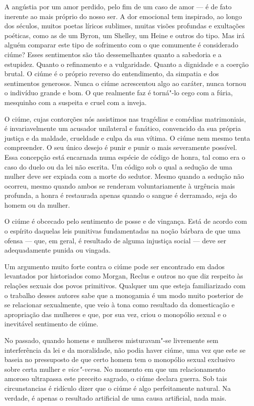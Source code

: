 A angústia por um amor perdido, pelo fim de um caso de amor --- é de fato
inerente ao mais próprio do nosso ser. A dor emocional tem inspirado, ao
longo dos séculos, muitos poetas líricos sublimes, muitas visões
profundas e exultações poéticas, como as de um Byron, um Shelley, um
Heine e outros do tipo. Mas irá alguém comparar este tipo de sofrimento
com o que comumente é considerado ciúme? Esses sentimentos são tão
dessemelhantes quanto a sabedoria e a estupidez. Quanto o refinamento e
a vulgaridade. Quanto a dignidade e a coerção brutal. O ciúme é o
próprio reverso do entendimento, da simpatia e dos sentimentos
generosos. Nunca o ciúme acrescentou algo ao caráter, nunca tornou o
indivíduo grande e bom. O que realmente faz é torná"-lo cego com a fúria,
mesquinho com a suspeita e cruel com a inveja.

O ciúme, cujas contorções nós assistimos nas tragédias e comédias
matrimoniais, é invariavelmente um acusador unilateral e fanático,
convencido da sua própria justiça e da maldade, crueldade e culpa da sua
vítima. O ciúme nem mesmo tenta compreender. O seu único desejo é punir
e punir o mais severamente possível. Essa concepção está encarnada numa espécie de
código de honra, tal como era o caso do duelo ou da lei não escrita. Um
código sob o qual a sedução de uma mulher deve ser expiada com a morte
do sedutor. Mesmo quando a sedução não ocorreu, mesmo quando ambos se
renderam voluntariamente à urgência mais profunda, a honra é restaurada
apenas quando o sangue é derramado, seja do homem ou da mulher.

O ciúme é obcecado pelo sentimento de posse e de vingança. Está de
acordo com o espírito daquelas leis punitivas fundamentadas na noção
bárbara de que uma ofensa --- que, em geral, é resultado de alguma
injustiça social --- deve ser adequadamente punida ou vingada.

Um argumento muito forte contra o ciúme pode ser encontrado em dados
levantados por historiados como Morgan, Reclus e outros no que diz
respeito às relações sexuais dos povos primitivos. Qualquer um que
esteja familiarizado com o trabalho desses autores sabe que a monogamia
é um modo muito posterior de se relacionar sexualmente, que veio à tona
como resultado da domesticação e apropriação das mulheres e que, por sua
vez, criou o monopólio sexual e o inevitável sentimento de ciúme.

No passado, quando homens e mulheres misturavam"-se livremente sem
interferência da lei e da moralidade, não podia haver ciúme, uma vez que
este se baseia no pressuposto de que certo homem tem o monopólio sexual
exclusivo sobre certa mulher e \emph{vice"-versa.} No momento em que um
relacionamento amoroso ultrapassa este preceito sagrado, o ciúme declara
guerra. Sob tais circunstancias é ridículo dizer que o ciúme é algo
perfeitamente natural. Na verdade, é apenas o resultado artificial de
uma causa artificial, nada mais.

